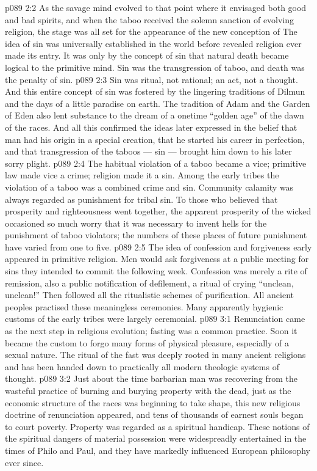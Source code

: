 \vs p089 2:2 As the savage mind evolved to that point where it envisaged both good and bad spirits, and when the taboo received the solemn sanction of evolving religion, the stage was all set for the appearance of the new conception of  The idea of sin was universally established in the world before revealed religion ever made its entry. It was only by the concept of sin that natural death became logical to the primitive mind. Sin was the transgression of taboo, and death was the penalty of sin.
\vs p089 2:3 Sin was ritual, not rational; an act, not a thought. And this entire concept of sin was fostered by the lingering traditions of Dilmun and the days of a little paradise on earth. The tradition of Adam and the Garden of Eden also lent substance to the dream of a onetime “golden age” of the dawn of the races. And all this confirmed the ideas later expressed in the belief that man had his origin in a special creation, that he started his career in perfection, and that transgression of the taboos --- sin --- brought him down to his later sorry plight.
\vs p089 2:4 The habitual violation of a taboo became a vice; primitive law made vice a crime; religion made it a sin. Among the early tribes the violation of a taboo was a combined crime and sin. Community calamity was always regarded as punishment for tribal sin. To those who believed that prosperity and righteousness went together, the apparent prosperity of the wicked occasioned so much worry that it was necessary to invent hells for the punishment of taboo violators; the numbers of these places of future punishment have varied from one to five.
\vs p089 2:5 The idea of confession and forgiveness early appeared in primitive religion. Men would ask forgiveness at a public meeting for sins they intended to commit the following week. Confession was merely a rite of remission, also a public notification of defilement, a ritual of crying “unclean, unclean!” Then followed all the ritualistic schemes of purification. All ancient peoples practised these meaningless ceremonies. Many apparently hygienic customs of the early tribes were largely ceremonial.
\vs p089 3:1 Renunciation came as the next step in religious evolution; fasting was a common practice. Soon it became the custom to forgo many forms of physical pleasure, especially of a sexual nature. The ritual of the fast was deeply rooted in many ancient religions and has been handed down to practically all modern theologic systems of thought.
\vs p089 3:2 Just about the time barbarian man was recovering from the wasteful practice of burning and burying property with the dead, just as the economic structure of the races was beginning to take shape, this new religious doctrine of renunciation appeared, and tens of thousands of earnest souls began to court poverty. Property was regarded as a spiritual handicap. These notions of the spiritual dangers of material possession were widespreadly entertained in the times of Philo and Paul, and they have markedly influenced European philosophy ever since.
